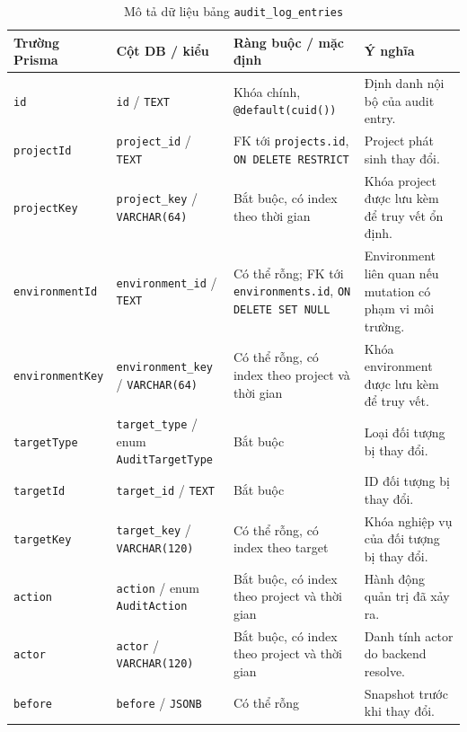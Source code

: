 \begin{table}[H]
    \centering
    \caption{Mô tả dữ liệu bảng \texttt{audit\_log\_entries}}
    \label{tab:db-audit-log-entries}
    \begingroup
    \singlespacing
    \scriptsize
    \setlength{\tabcolsep}{3pt}
    \renewcommand{\arraystretch}{1.12}
    \begin{tabular}{p{} p{} p{} p{}}
        \toprule
        \textbf{Trường Prisma} & \textbf{Cột DB / kiểu} & \textbf{Ràng buộc / mặc định} & \textbf{Ý nghĩa} \\
        \midrule
        \texttt{id} & \texttt{id} / \texttt{TEXT} & Khóa chính, \texttt{@default(cuid())} & Định danh nội bộ của audit entry. \\
        \texttt{projectId} & \texttt{project\_id} / \texttt{TEXT} & FK tới \texttt{projects.id}, \texttt{ON DELETE RESTRICT} & Project phát sinh thay đổi. \\
        \texttt{projectKey} & \texttt{project\_key} / \texttt{VARCHAR(64)} & Bắt buộc, có index theo thời gian & Khóa project được lưu kèm để truy vết ổn định. \\
        \texttt{environmentId} & \texttt{environment\_id} / \texttt{TEXT} & Có thể rỗng; FK tới \texttt{environments.id}, \texttt{ON DELETE SET NULL} & Environment liên quan nếu mutation có phạm vi môi trường. \\
        \texttt{environmentKey} & \texttt{environment\_key} / \texttt{VARCHAR(64)} & Có thể rỗng, có index theo project và thời gian & Khóa environment được lưu kèm để truy vết. \\
        \texttt{targetType} & \texttt{target\_type} / enum \texttt{AuditTargetType} & Bắt buộc & Loại đối tượng bị thay đổi. \\
        \texttt{targetId} & \texttt{target\_id} / \texttt{TEXT} & Bắt buộc & ID đối tượng bị thay đổi. \\
        \texttt{targetKey} & \texttt{target\_key} / \texttt{VARCHAR(120)} & Có thể rỗng, có index theo target & Khóa nghiệp vụ của đối tượng bị thay đổi. \\
        \texttt{action} & \texttt{action} / enum \texttt{AuditAction} & Bắt buộc, có index theo project và thời gian & Hành động quản trị đã xảy ra. \\
        \texttt{actor} & \texttt{actor} / \texttt{VARCHAR(120)} & Bắt buộc, có index theo project và thời gian & Danh tính actor do backend resolve. \\
        \texttt{before} & \texttt{before} / \texttt{JSONB} & Có thể rỗng & Snapshot trước khi thay đổi. \\

\end{tabular}
\end{table}
